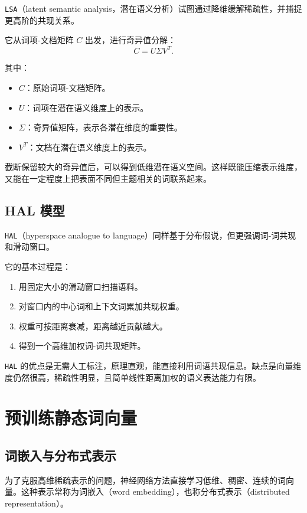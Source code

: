 \texttt{LSA}（latent semantic analysis，潜在语义分析）试图通过降维缓解稀疏性，并捕捉更高阶的共现关系。

它从词项-文档矩阵 $C$ 出发，进行奇异值分解：
\[
  C = U\Sigma V^T.
\]

其中：
\begin{itemize}
  \item $C$：原始词项-文档矩阵。
  \item $U$：词项在潜在语义维度上的表示。
  \item $\Sigma$：奇异值矩阵，表示各潜在维度的重要性。
  \item $V^T$：文档在潜在语义维度上的表示。
\end{itemize}

截断保留较大的奇异值后，可以得到低维潜在语义空间。这样既能压缩表示维度，又能在一定程度上把表面不同但主题相关的词联系起来。

\subsection{HAL 模型}

\texttt{HAL}（hyperspace analogue to language）同样基于分布假说，但更强调词-词共现和滑动窗口。

它的基本过程是：
\begin{enumerate}
  \item 用固定大小的滑动窗口扫描语料。
  \item 对窗口内的中心词和上下文词累加共现权重。
  \item 权重可按距离衰减，距离越近贡献越大。
  \item 得到一个高维加权词-词共现矩阵。
\end{enumerate}

\texttt{HAL} 的优点是无需人工标注，原理直观，能直接利用词语共现信息。缺点是向量维度仍然很高，稀疏性明显，且简单线性距离加权的语义表达能力有限。

\section{预训练静态词向量}

\subsection{词嵌入与分布式表示}

为了克服高维稀疏表示的问题，神经网络方法直接学习低维、稠密、连续的词向量。这种表示常称为词嵌入（word embedding），也称分布式表示（distributed representation）。

